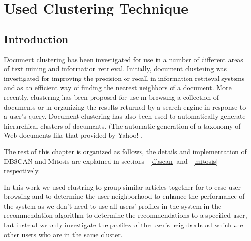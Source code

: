 
\chapter{Used Clustering Technique} %

\label{clustering} %


\section{Introduction} \label{sec:intro}
Document clustering has been investigated for use in a number of different areas of text
mining and information retrieval. Initially, document clustering was investigated for improving
the precision or recall in information retrieval systems and as an efficient way of
finding the nearest neighbors of a document. More recently, clustering has been
proposed for use in browsing a collection of documents or in organizing the results
returned by a search engine in response to a user's query. Document clustering has
also been used to automatically generate hierarchical clusters of documents. (The
automatic generation of a taxonomy of Web documents like that provided by Yahoo! \citep{clustering_15}.

The rest of this chapter is organized as follows, the details and implementation of DBSCAN and Mitosis are explained in sections ~\ref{dbscan} and ~\ref{mitosis} respectively.


In this work we used clustring to group similar articles together for to ease user browsing and to determine the user neighborhood to enhance the performance of the system as we don't need to use all users' profiles in the system in the recommendation algorithm to determine the recommendations to a specified user, but instead we only investigate the profiles of the user's neighborhood which are other users who are in the same cluster.

